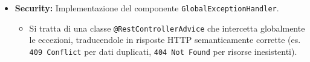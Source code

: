 \begin{itemize}
    \item \textbf{Security:} Implementazione del componente \texttt{GlobalExceptionHandler}.
    \begin{itemize}
        \item Si tratta di una classe \texttt{@RestControllerAdvice} che intercetta globalmente le eccezioni, traducendole in risposte HTTP semanticamente corrette (es. \texttt{409 Conflict} per dati duplicati, \texttt{404 Not Found} per risorse inesistenti).
    \end{itemize}
\end{itemize}